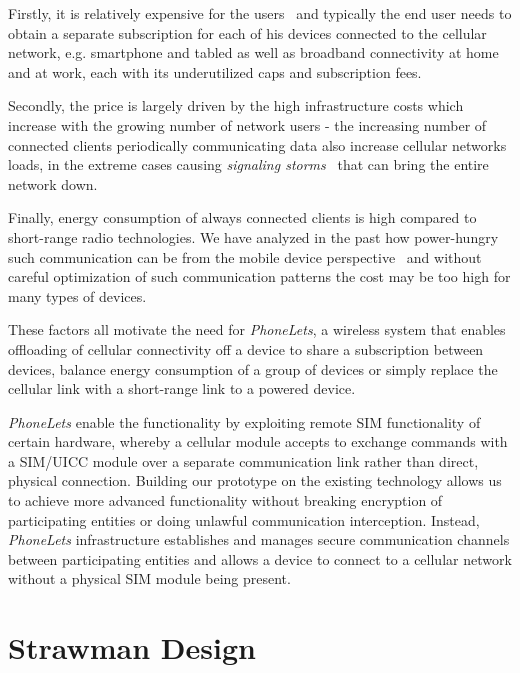 \documentclass{sig-alternate-10pt}
\begin{document}
Firstly, it is relatively expensive for the users~\cite{Anonymous:2013ut} and typically the end user needs to obtain a separate subscription for each of his devices connected to the cellular network, e.g. smartphone and tabled as well as broadband connectivity at home and at work, each with its underutilized caps and subscription fees.

Secondly, the price is largely driven by the high infrastructure costs which increase with the growing number of network users - the increasing number of connected clients periodically communicating data also increase cellular networks loads, in the extreme cases causing \emph{signaling storms}~\cite{Yang:wh} that can bring the entire network down.

Finally, energy consumption of always connected clients is high compared to short-range radio technologies. We have analyzed in the past how power-hungry such communication can be from the mobile device perspective~\cite{Aucinas:2013uk} and without careful optimization of such communication patterns the cost may be too high for many types of devices.

These factors all motivate the need for \emph{PhoneLets}, a wireless system that enables offloading of cellular connectivity off a device to share a subscription between devices, balance energy consumption of a group of devices or simply replace the cellular link with a short-range link to a powered device.

\emph{PhoneLets} enable the functionality by exploiting remote SIM functionality of certain hardware, whereby a cellular module accepts to exchange commands with a SIM/UICC module over a separate communication link rather than direct, physical connection. Building our prototype on the existing technology allows us to achieve more advanced functionality without breaking encryption of participating entities or doing unlawful communication interception. Instead, \emph{PhoneLets} infrastructure establishes and manages secure communication channels between participating entities and allows a device to connect to a cellular network without a physical SIM module being present.


\section{Strawman Design}
\end{document}
